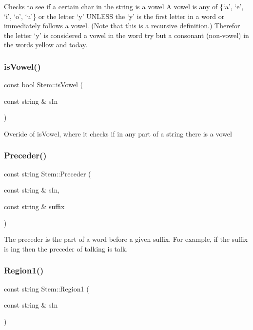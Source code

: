 Checks to see if a certain char in the string is a vowel A vowel is any of \{‘a’, ‘e’, ‘i’, ‘o’, ‘u’\} or the letter ‘y’ U\+N\+L\+E\+SS the ‘y’ is the first letter in a word or immediately follows a vowel. (Note that this is a recursive definition.) Therefor the letter ‘y’ is considered a vowel in the word try but a consonant (non-\/vowel) in the words yellow and today. \mbox{\label{class_stem_a56081e6af3591dd325b8a34dc1f6e0ab}} 
\subsubsection{\texorpdfstring{is\+Vowel()}{isVowel()}\hspace{0.1cm}{\footnotesize\ttfamily [2/2]}}
{\footnotesize\ttfamily const bool Stem\+::is\+Vowel (\begin{DoxyParamCaption}\item[{const string \&}]{s\+In }\end{DoxyParamCaption})}

Overide of is\+Vowel, where it checks if in any part of a string there is a vowel \mbox{\label{class_stem_ac95ecce7610007cf1c4d27f504acbc00}} 
\subsubsection{\texorpdfstring{Preceder()}{Preceder()}}
{\footnotesize\ttfamily const string Stem\+::\+Preceder (\begin{DoxyParamCaption}\item[{const string \&}]{s\+In,  }\item[{const string \&}]{suffix }\end{DoxyParamCaption})}

The preceder is the part of a word before a given suffix. For example, if the suffix is ing then the preceder of talking is talk. \mbox{\label{class_stem_aefe1ebdd09e2c9be6e70d986740f8a2f}} 
\subsubsection{\texorpdfstring{Region1()}{Region1()}}
{\footnotesize\ttfamily const string Stem\+::\+Region1 (\begin{DoxyParamCaption}\item[{const string \&}]{s\+In }\end{DoxyParamCaption})}

